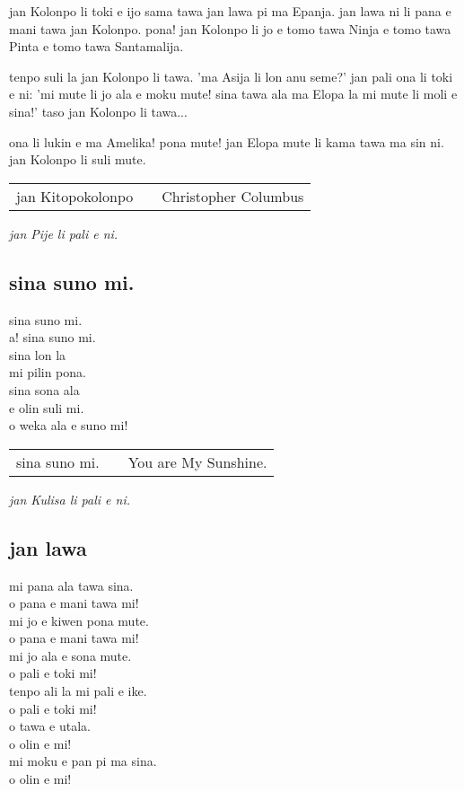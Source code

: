 jan Kolonpo li toki e ijo sama tawa jan lawa pi ma Epanja. jan lawa
ni li pana e mani tawa jan Kolonpo. pona! jan Kolonpo li jo e tomo
tawa Ninja e tomo tawa Pinta e tomo tawa Santamalija.

tenpo suli la jan Kolonpo li tawa. 'ma Asija li lon anu seme?' jan
pali ona li toki e ni: 'mi mute li jo ala e moku mute! sina tawa ala
ma Elopa la mi mute li moli e sina!' taso jan Kolonpo li tawa...

ona li lukin e ma Amelika! pona mute! jan Elopa mute li kama tawa ma
sin ni. jan Kolonpo li suli mute.

\begin{supertabular}{p{5,5cm}|ll}
jan Kitopokolonpo && Christopher Columbus \\
\end{supertabular}

\textit{jan Pije li pali e ni. \cite{www:Pije:01}}

\subsection{sina suno mi.}

sina suno mi. \\
a! sina suno mi. \\
sina lon la \\
mi pilin pona. \\
sina sona ala \\
e olin suli mi. \\
o weka ala e suno mi! 

\begin{supertabular}{p{5,5cm}|ll}
sina suno mi. && You are My Sunshine. \\
\end{supertabular}

\textit{jan Kulisa li pali e ni. \cite{www:janKluisa:01}}
%
\newpage
\subsection{jan lawa}

mi pana ala tawa sina. \\
o pana e mani tawa mi! \\
mi jo e kiwen pona mute. \\
o pana e mani tawa mi! \\
mi jo ala e sona mute. \\
o pali e toki mi!  \\
tenpo ali la mi pali e ike. \\
o pali e toki mi! \\
o tawa e utala. \\
o olin e mi! \\
mi moku e pan pi ma sina. \\
o olin e mi!


